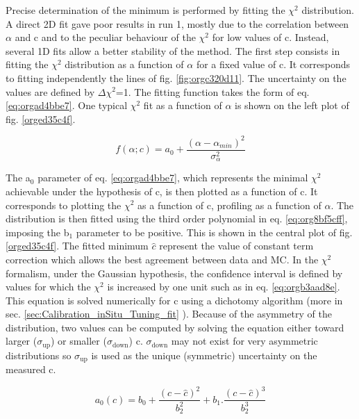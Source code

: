 Precise determination of the minimum is performed by fitting the $\chi^2$ distribution.
A direct 2D fit gave poor results in run 1, mostly due to the correlation between \(\alpha\) and c and to the peculiar behaviour of the $\chi^2$ for low values of c.
Instead, several 1D fits allow a better stability of the method.
The first step consists in fitting the $\chi^2$ distribution as a function of \(\alpha\) for a fixed value of c.
It corresponds to fitting independently the lines of fig. \ref{fig:orgc320d11}.
The uncertainty on the values are defined by \(\Delta \chi^{\text{2}}\)=1.
The fitting function takes the form of eq. \ref{eq:orgad4bbe7}.
One typical $\chi^2$ fit as a function of \(\alpha\) is shown on the left plot of fig. \ref{orged35c4f}.

\begin{equation}
\label{eq:orgad4bbe7}
f(\alpha;c)=a_0+\frac{(\alpha-\alpha_{min})^2}{\sigma_\alpha^2}
\end{equation}


The a\(_{\text{0}}\) parameter of eq. \ref{eq:orgad4bbe7}, which represents the minimal $\chi^2$ achievable under the hypothesis of c, is then plotted as a function of c.
It corresponds to plotting the $\chi^2$ as a function of c, profiling as a function of \(\alpha\).
The distribution is then fitted using the third order polynomial in eq. \ref{eq:org8bf5cff}, imposing the b\(_{\text{1}}\) parameter to be positive.
This is shown in the central plot of fig. \ref{orged35c4f}.
The fitted minimum \(\hat{c}\) represent the value of constant term correction which allows the best agreement between data and MC.
In the $\chi^2$ formalism, under the Gaussian hypothesis, the confidence interval is defined by values for which the $\chi^2$ is increased by one unit such as in eq. \ref{eq:orgb3aad8e}.
This equation is solved numerically for c using a dichotomy algorithm (more in sec. \ref{sec:Calibration_inSitu_Tuning_fit} ).
Because of the asymmetry of the distribution, two values can be computed by solving the equation either toward larger (\(\sigma_{\text{up}}\)) or smaller (\(\sigma_{\text{down}}\)) c.
\(\sigma_{\text{down}}\) may not exist for very asymmetric distributions so \(\sigma_{\text{up}}\) is used as the unique (symmetric) uncertainty on the measured c.

\begin{equation}
\label{eq:org8bf5cff}
  a_0(c)=b_0+\frac{(c-\hat{c})^2}{b_2^2} + b_1 . \frac{(c-\hat{c})^3}{b_2^3}
\end{equation}



